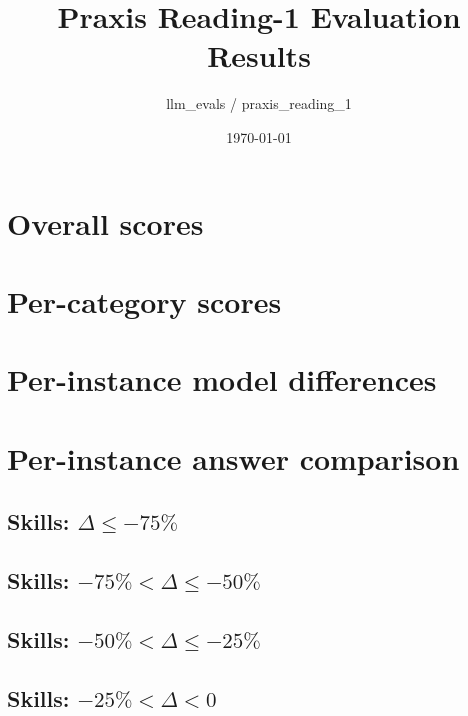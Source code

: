\documentclass{article}
\title{Praxis Reading-1 Evaluation Results}
\author{llm\_evals / praxis\_reading\_1}
\date{\today}
\begin{document}
\maketitle

\section{Overall scores}



\section{Per-category scores}









\section{Per-instance model differences}



\section{Per-instance answer comparison}

\subsection{Skills: $\Delta \leq -75\%$}



\subsection{Skills: $-75\% < \Delta \leq -50\%$}



\subsection{Skills: $-50\% < \Delta \leq -25\%$}



\subsection{Skills: $-25\% < \Delta < 0$}
\end{document}
